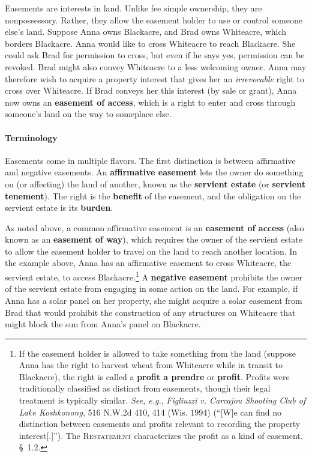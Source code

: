 Easements are interests in land. Unlike fee simple ownership, they are
nonpossessory. Rather, they allow the easement holder to use or control someone
else's land. Suppose Anna owns Blackacre, and Brad owns Whiteacre, which borders
Blackacre. Anna would like to cross Whiteacre to reach Blackacre. She could ask
Brad for permission to cross, but even if he says yes, permission can be
revoked. Brad might also convey Whiteacre to a less welcoming owner. Anna may
therefore wish to acquire a property interest that gives her an
\textit{irrevocable} right to cross over Whiteacre. If Brad conveys her this
interest (by sale or grant), Anna now owns an \textbf{easement of access}, which
is a right to enter and cross through someone's land on the way to someplace
else.

\paragraph{Terminology}
Easements come in multiple flavors. The first distinction is between affirmative
and negative easements. An \textbf{affirmative easement} lets the owner do
something on (or affecting) the land of another, known as the \textbf{servient
estate} (or \textbf{servient tenement}). The right is the \textbf{benefit} of
the easement, and the obligation on the servient estate is its \textbf{burden}.


As noted above, a common affirmative easement is an \textbf{easement of access}
(also known as an \textbf{easement of way}), which requires the owner of the
servient estate to allow the easement holder to travel on the land to reach
another location. In the example above, Anna has an affirmative easement to
cross Whiteacre, the servient estate, to access Blackacre.\footnote{If the
easement holder is allowed to take something from the land (suppose Anna has the
right to harvest wheat from Whiteacre while in transit to Blackacre), the right
is called a \textbf{profit a prendre} or \textbf{profit}. Profits were
traditionally classified as distinct from easements, though their legal
treatment is typically similar. \textit{See, e.g.}, \emph{Figliuzzi v. Carcajou
Shooting Club of Lake Koshkonong}, 516 N.W.2d 410, 414 (Wis. 1994) (``[W]e can
find no distinction between easements and profits relevant to recording the
property interest[.]''). The \textsc{Restatement} characterizes the profit as a
kind of easement. \S~1.2.} A \textbf{negative easement} prohibits the owner of
the servient estate from engaging in some action on the land. For example, if
Anna has a solar panel on her property, she might acquire a solar easement from
Brad that would prohibit the construction of any structures on Whiteacre that
might block the sun from Anna's panel on Blackacre. 

